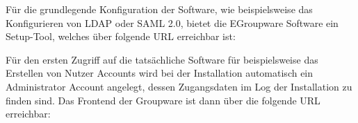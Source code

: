 Für die grundlegende Konfiguration der Software, wie beispielsweise das Konfigurieren von LDAP oder SAML 2.0, bietet die EGroupware Software ein Setup-Tool, welches über folgende URL erreichbar ist:


Für den ersten Zugriff auf die tatsächliche Software für beispielsweise das Erstellen von Nutzer Accounts wird bei der Installation automatisch ein Administrator Account angelegt, dessen Zugangsdaten im Log der Installation zu finden sind.
Das Frontend der Groupware ist dann über die folgende URL erreichbar:

